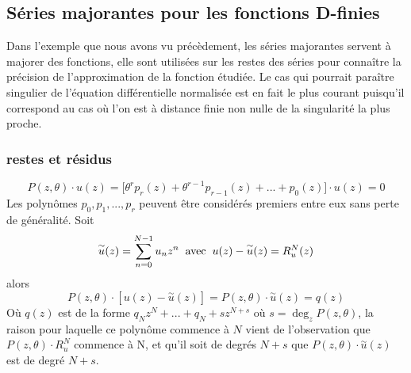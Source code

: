 \documentclass[a4paper,10.5pt]{article}
\begin{document}
	\subsection{Séries majorantes pour les fonctions D-finies}
	Dans l'exemple que nous avons vu précèdement, les séries majorantes servent à majorer des fonctions, elle sont utilisées sur les restes des séries pour connaître la précision de l'approximation de la fonction étudiée.
	Le cas qui pourrait paraître singulier de l'équation différentielle normalisée est en fait le plus courant puisqu'il correspond au cas où l'on est à distance finie non nulle de la singularité la plus proche.
	
	\subsubsection{restes et résidus}
	\begin{equation}
	P(z,\theta) \cdot u(z)=\big[\theta^{r}p_r(z)+\theta^{r-1}p_{r-1}(z)+...+p_0(z)\big]\cdot u(z)=0
	\label{Eqdiff}
	\end{equation}
	Les polynômes $p_0,p_1,...,p_r$ peuvent être considérés premiers entre eux sans perte de généralité. Soit
	 \[\overset{\sim}{u}(z)=\sum_{n=0}^{N-1}u_n z^n\hspace{2mm}\text{avec}\hspace{2mm}u(z)-\overset{\sim}{u}(z)=R_u^{N}(z)\] 
	alors 
	\[  P(z,\theta) \cdot [u(z)-\overset{\sim}{u}(z)]=P(z,\theta)\cdot \overset{\sim}{u}(z)=q(z)\]
	Où $q(z)$ est de la forme $q_Nz^N+...+q_N+sz^{N+s}$ où $s= \deg_{z}P(z,\theta)$, la raison pour laquelle ce polynôme commence à $N$ vient de l'observation que 
	$P(z,\theta)\cdot R_u^{N}$ commence à N, et qu'il soit de degrés $N+s$ que $P(z,\theta)\cdot\overset{\sim}{u}(z)$ est de degré $N+s$.
	\\
\end{document}
